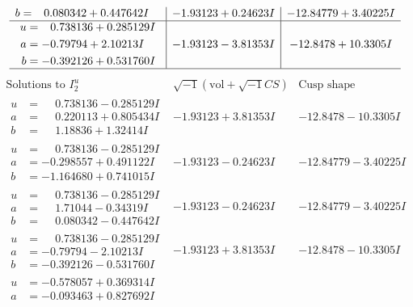 \documentclass[1p]{elsarticle_modified}
\theoremstyle{definition}
\newcommand{\I}{\sqrt{-1}}
\begin{document}
$$\begin{array}{c|c|c}
\begin{aligned}
b &= \phantom{-}0.080342 + 0.447642 I\end{aligned}
 & -1.93123 + 0.24623 I & -12.84779 + 3.40225 I \\ \hline\begin{aligned}
u &= \phantom{-}0.738136 + 0.285129 I \\
a &= -0.79794 + 2.10213 I \\
b &= -0.392126 + 0.531760 I\end{aligned}
 & -1.93123 - 3.81353 I & -12.8478 + 10.3305 I\\
 \hline 
 \end{array}$$\newpage$$\begin{array}{c|c|c}  
\text{Solutions to }I^u_{2}& \I (\text{vol} + \sqrt{-1}CS) & \text{Cusp shape}\\
 \hline 
\begin{aligned}
u &= \phantom{-}0.738136 - 0.285129 I \\
a &= \phantom{-}0.220113 + 0.805434 I \\
b &= \phantom{-}1.18836 + 1.32414 I\end{aligned}
 & -1.93123 + 3.81353 I & -12.8478 - 10.3305 I \\ \hline\begin{aligned}
u &= \phantom{-}0.738136 - 0.285129 I \\
a &= -0.298557 + 0.491122 I \\
b &= -1.164680 + 0.741015 I\end{aligned}
 & -1.93123 - 0.24623 I & -12.84779 - 3.40225 I \\ \hline\begin{aligned}
u &= \phantom{-}0.738136 - 0.285129 I \\
a &= \phantom{-}1.71044 - 0.34319 I \\
b &= \phantom{-}0.080342 - 0.447642 I\end{aligned}
 & -1.93123 - 0.24623 I & -12.84779 - 3.40225 I \\ \hline\begin{aligned}
u &= \phantom{-}0.738136 - 0.285129 I \\
a &= -0.79794 - 2.10213 I \\
b &= -0.392126 - 0.531760 I\end{aligned}
 & -1.93123 + 3.81353 I & -12.8478 - 10.3305 I \\ \hline\begin{aligned}
u &= -0.578057 + 0.369314 I \\
a &= -0.093463 + 0.827692 I \\

\end{aligned}
\end{array}$$
\end{document}
